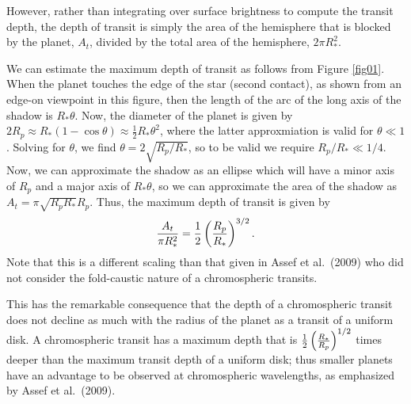 \documentclass[manuscript]{aastex}
\begin{document}
However, rather than integrating over surface brightness to compute
the transit depth, the depth of transit is simply the area of the 
hemisphere that is blocked by the planet, $A_t$, divided by the total
area of the hemisphere, $2\pi R_*^2$.

We can estimate the maximum depth of transit as follows from
Figure \ref{fig01}.  When the planet touches the edge of the star 
(second contact), as shown from an edge-on viewpoint in this figure,
then the length of the arc of the long axis of the shadow is
$R_*\theta$.  Now, the diameter of the planet is given by 
$2 R_p \approx R_*(1-\cos{\theta}) \approx \frac{1}{2} R_* \theta^2$,
where the latter approxmiation is valid for $\theta \ll 1$.
Solving for $\theta$, we find $\theta = 2\sqrt{R_p/R_*}$, so to
be valid we require $R_p/R_* \ll 1/4$.  Now, we can approximate
the shadow as an ellipse which will have a minor axis of $R_p$
and a major axis of $R_*\theta$, so we can approximate the
area of the shadow as $A_t = \pi \sqrt{R_pR_*} R_p$.  Thus,
the maximum depth of transit is given by 
\begin{equation} \label{depth_anal}
{A_t \over \pi R_*^2} = \frac{1}{2} \left({R_p \over R_*}\right)^{3/2}.
\end{equation}
Note that this is a different scaling than that given in Assef et 
al.\ (2009) who did not consider the fold-caustic nature of a chromospheric
transits.

This has the remarkable consequence that the depth of a chromospheric
transit does not decline as much with the radius of the planet as 
a transit of a uniform disk.  A chromospheric transit has a maximum
depth that is $\frac{1}{2} \left({R_* \over R_p}\right)^{1/2}$
times deeper than the maximum transit depth of a uniform disk;
thus smaller planets have an advantage to be observed at
chromospheric wavelengths, as emphasized by Assef et al.\ (2009).
\end{document}
